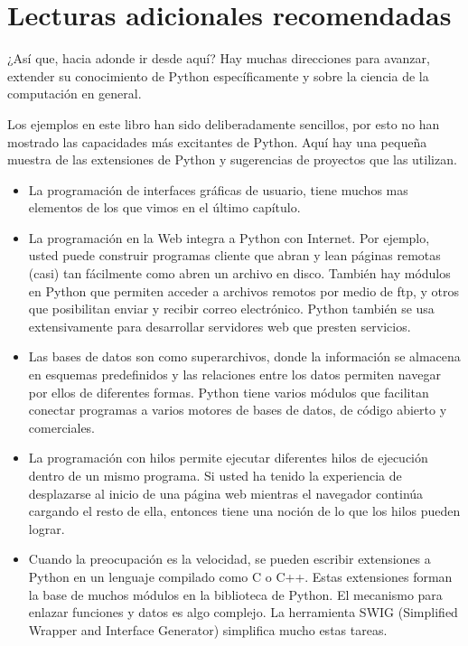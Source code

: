 
\chapter{Lecturas adicionales recomendadas}

¿Así que, hacia adonde ir desde aquí? Hay muchas direcciones para
avanzar, extender su conocimiento de Python específicamente y sobre
la ciencia de la computación en general.

Los ejemplos en este libro han sido deliberadamente sencillos, por
esto no han mostrado las capacidades más excitantes de Python. Aquí
hay una pequeña muestra de las extensiones de Python y sugerencias
de proyectos que las utilizan.
\begin{itemize}
\item La programación de interfaces gráficas de usuario, tiene muchos mas
elementos de los que vimos en el último capítulo.
\item La programación en la Web integra a Python con Internet. Por ejemplo,
usted puede construir programas cliente que abran y lean páginas remotas
(casi) tan fácilmente como abren un archivo en disco. También hay
módulos en Python que permiten acceder a archivos remotos por medio
de ftp, y otros que posibilitan enviar y recibir correo electrónico.
Python también se usa extensivamente para desarrollar servidores web
que presten servicios.
\item Las bases de datos son como superarchivos, donde la información se
almacena en esquemas predefinidos y las relaciones entre los datos
permiten navegar por ellos de diferentes formas. Python tiene varios
módulos que facilitan conectar programas a varios motores de bases
de datos, de código abierto y comerciales.
\item La programación con hilos permite ejecutar diferentes hilos de ejecución
dentro de un mismo programa. Si usted ha tenido la experiencia de
desplazarse al inicio de una página web mientras el navegador continúa
cargando el resto de ella, entonces tiene una noción de lo que los
hilos pueden lograr.
\item Cuando la preocupación es la velocidad, se pueden escribir extensiones
a Python en un lenguaje compilado como C o C++. Estas extensiones
forman la base de muchos módulos en la biblioteca de Python. El mecanismo
para enlazar funciones y datos es algo complejo. La herramienta SWIG
(Simplified Wrapper and Interface Generator) simplifica mucho estas
tareas. 
\end{itemize}

